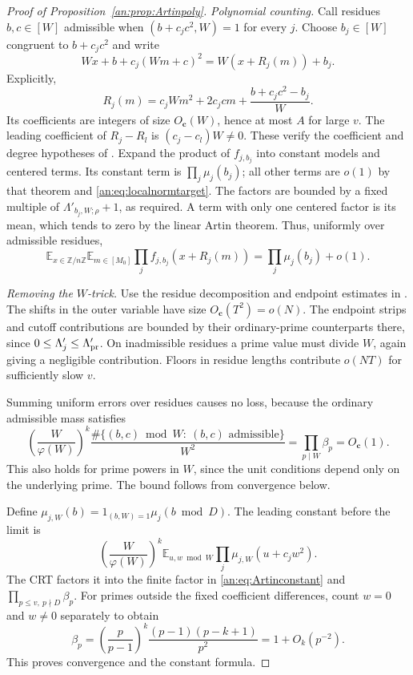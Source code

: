 \documentclass[11pt,reqno]{amsart}
\theoremstyle{definition}
\numberwithin{equation}{section}
\newcommand{\Lam}{\Lambda'}
\newcommand{\Z}{\mathbb Z}
\begin{document}
\begin{proof}[Proof of Proposition~\ref{an:prop:Artinpoly}]
\emph{Polynomial counting.}
Call residues $b,c\in[W]$ admissible when $(b+c_jc^2,W)=1$ for every $j$. Choose $b_j\in[W]$ congruent to $b+c_jc^2$ and write
\begin{equation}\label{an:eq:innerpolys}
 W x+b+c_j(Wm+c)^2=W(x+R_j(m))+b_j.
\end{equation}
Explicitly,
\[
 R_j(m)=c_jWm^2+2c_jcm+\frac{b+c_jc^2-b_j}{W}.
\]
Its coefficients are integers of size $O_{\boldsymbol c}(W)$, hence at most $A$ for large $v$. The leading coefficient of $R_j-R_l$ is $(c_j-c_l)W\ne0$. These verify the coefficient and degree hypotheses of \cite[Theorem 4.1]{TZpoly}. Expand the product of $f_{j,b_j}$ into constant models and centered terms. Its constant term is $\prod_j\mu_j(b_j)$; all other terms are $o(1)$ by that theorem and \eqref{an:eq:localnormtarget}. The factors are bounded by a fixed multiple of $\Lambda'_{b_j,W;\rho}+1$, as required. A term with only one centered factor is its mean, which tends to zero by the linear Artin theorem. Thus, uniformly over admissible residues,
\[
 \mathbb E_{x\in\Z/n\Z}\mathbb E_{m\in[M_0]}
       \prod_j f_{j,b_j}(x+R_j(m))
   =\prod_j\mu_j(b_j)+o(1).
\]

\emph{Removing the $W$-trick.}
Use the residue decomposition and endpoint estimates in \cite[Section 5, proof of Theorem 1.4]{TZpoly}. The shifts in the outer variable have size $O_{\boldsymbol c}(T^2)=o(N)$. The endpoint strips and cutoff contributions are bounded by their ordinary-prime counterparts there, since $0\le\Lam_j\le\Lambda'_{\rm pr}$. On inadmissible residues a prime value must divide $W$, again giving a negligible contribution. Floors in residue lengths contribute $o(NT)$ for sufficiently slow $v$.

Summing uniform errors over residues causes no loss, because the ordinary admissible mass satisfies
\begin{equation}\label{an:eq:admissiblemass}
 \left(\frac W{\varphi(W)}\right)^k
  \frac{\#\{(b,c)\bmod W:\ (b,c)\text{ admissible}\}}{W^2}
   =\prod_{p\mid W}\beta_p=O_{\boldsymbol c}(1).
\end{equation}
This also holds for prime powers in $W$, since the unit conditions depend only on the underlying prime. The bound follows from convergence below.

Define $\mu_{j,W}(b)=1_{(b,W)=1}\mu_j(b\bmod D)$. The leading constant before the limit is
\[
 \left(\frac W{\varphi(W)}\right)^k
   \mathbb E_{u,w\bmod W}\prod_j\mu_{j,W}(u+c_jw^2).
\]
The CRT factors it into the finite factor in \eqref{an:eq:Artinconstant} and $\prod_{p\le v,\ p\nmid D}\beta_p$. For primes outside the fixed coefficient differences, count $w=0$ and $w\ne0$ separately to obtain
\[
 \beta_p=\left(\frac p{p-1}\right)^k
             \frac{(p-1)(p-k+1)}{p^2}=1+O_k(p^{-2}).
\]
This proves convergence and the constant formula.


\end{proof}
\end{document}
